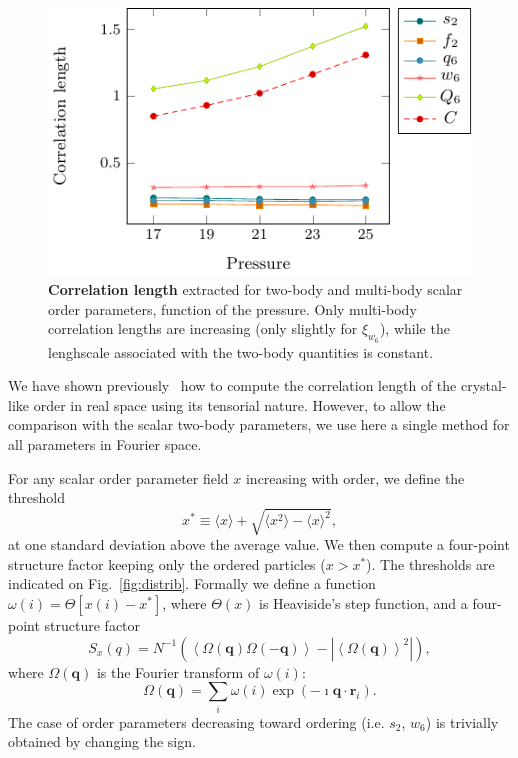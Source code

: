 \documentclass[twocolumn,superscriptaddress]{revtex4-1}
\begin{document}
\begin{figure}
	\centering
	\includegraphics{fig_lengths}
	\caption{\textbf{Correlation length} extracted for two-body and multi-body scalar order parameters, function of the pressure. Only multi-body correlation lengths are increasing (only slightly for $\xi_{w_6}$), while the lenghscale associated with the two-body quantities is constant.}
	\label{fig:Fourierlengths}
\end{figure}

We have shown previously~\cite{tanaka,kawasaki,mathieu_icosahedra,russo_gcm,russo_hs} how to compute the correlation length of the crystal-like order in real space using its tensorial nature. However, to allow the comparison with the scalar two-body parameters, we use here a single method for all parameters in Fourier space.

For any scalar order parameter field $x$ increasing with order, we define the threshold 
\begin{equation}
x^* \equiv \langle x\rangle + \sqrt{\langle x^2\rangle - \langle x\rangle^2},
\label{eq:xstar}
\end{equation}
at one standard deviation above the average value. We then compute a four-point structure factor keeping only the ordered particles ($x>x^*$). The thresholds are indicated on Fig.~\ref{fig:distrib}. Formally we define a function $\omega(i) = \Theta [x(i) - x^*]$, where $\Theta(x)$ is Heaviside’s step function, and a four-point structure factor
\begin{equation}
	S_x(q) = N^{-1}(\left\langle \Omega(\mathbf{q}) \Omega(-\mathbf{q}) \right\rangle - | \left\langle \Omega(\mathbf{q}) \right\rangle^2 |),   
	\label{eq:StrutureFactor}
\end{equation}
where $\Omega(\mathbf{q})$ is the Fourier transform of $\omega(i)$: 
\begin{equation}
	\Omega(\mathbf{q}) = \sum_i \omega(i)\exp(-\imath \mathbf{q}\cdot\mathbf{r}_i).  
\end{equation}
The case of order parameters decreasing toward ordering (i.e. $s_2$, $w_6$) is trivially obtained by changing the sign.
\end{document}
